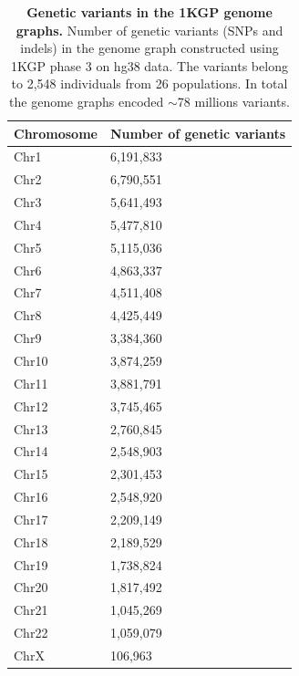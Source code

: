 \documentclass[a4paper, titlepage, openright]{book}
\begin{document}
\begin{table}[!]
    \centering
    \begin{tabular}{|p{4cm}|p{6cm}|}
        \hline
        \textbf{Chromosome} & \textbf{Number of genetic variants} \\
        \hline
        Chr1 & 6,191,833\\
        \hline
        Chr2 & 6,790,551\\
        \hline
        Chr3 & 5,641,493\\
        \hline
        Chr4 & 5,477,810\\
        \hline
        Chr5 & 5,115,036\\
        \hline
        Chr6 & 4,863,337\\
        \hline
        Chr7 & 4,511,408\\
        \hline
        Chr8 & 4,425,449\\
        \hline
        Chr9 & 3,384,360\\
        \hline
        Chr10 & 3,874,259\\
        \hline
        Chr11 & 3,881,791\\
        \hline
        Chr12 & 3,745,465\\
        \hline
        Chr13 & 2,760,845\\
        \hline
        Chr14 & 2,548,903\\
        \hline
        Chr15 & 2,301,453\\
        \hline
        Chr16 & 2,548,920\\
        \hline
        Chr17 & 2,209,149\\
        \hline
        Chr18 & 2,189,529\\
        \hline
        Chr19 & 1,738,824\\
        \hline
        Chr20 & 1,817,492\\
        \hline
        Chr21 & 1,045,269\\
        \hline
        Chr22 & 1,059,079\\
        \hline
        ChrX & 106,963\\
        \hline
    \end{tabular}
    \caption[Genetic variants in the 1KGP genome graphs]{\textbf{Genetic variants in the 1KGP genome graphs.} Number of genetic variants (SNPs and indels) in the genome graph constructed using 1KGP phase 3 on hg38 data. The variants belong to 2,548 individuals from 26 populations. In total the genome graphs encoded $\sim$78 millions variants.}
    \label{table-1KGP-variants}
\end{table}
\end{document}

